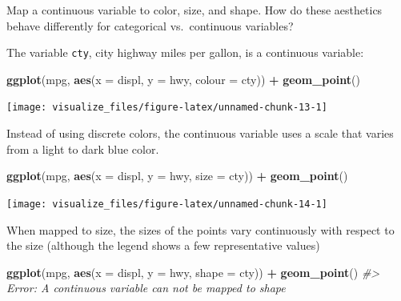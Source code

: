 \documentclass[]{book}
\newenvironment{Shaded}{\begin{snugshade}}{\end{snugshade}}
\newcommand{\CommentTok}[1]{\textcolor[rgb]{0.56,0.35,0.01}{\textit{#1}}}
\newcommand{\DataTypeTok}[1]{\textcolor[rgb]{0.13,0.29,0.53}{#1}}
\newcommand{\KeywordTok}[1]{\textcolor[rgb]{0.13,0.29,0.53}{\textbf{#1}}}
\newcommand{\NormalTok}[1]{#1}
\newcommand{\OperatorTok}[1]{\textcolor[rgb]{0.81,0.36,0.00}{\textbf{#1}}}
\newcommand{\StringTok}[1]{\textcolor[rgb]{0.31,0.60,0.02}{#1}}
\theoremstyle{plain}
\theoremstyle{remark}
\begin{document}
Map a continuous variable to color, size, and shape.
How do these aesthetics behave differently for categorical vs.~continuous variables?

The variable \texttt{cty}, city highway miles per gallon, is a continuous variable:

\begin{Shaded}
\begin{Highlighting}[]
\KeywordTok{ggplot}\NormalTok{(mpg, }\KeywordTok{aes}\NormalTok{(}\DataTypeTok{x =}\NormalTok{ displ, }\DataTypeTok{y =}\NormalTok{ hwy, }\DataTypeTok{colour =}\NormalTok{ cty)) }\OperatorTok{+}
\StringTok{  }\KeywordTok{geom_point}\NormalTok{()}
\end{Highlighting}
\end{Shaded}

\begin{center}\texttt{[image: visualize\_files/figure-latex/unnamed-chunk-13-1]} \end{center}

Instead of using discrete colors, the continuous variable uses a scale that varies from a light to dark blue color.

\begin{Shaded}
\begin{Highlighting}[]
\KeywordTok{ggplot}\NormalTok{(mpg, }\KeywordTok{aes}\NormalTok{(}\DataTypeTok{x =}\NormalTok{ displ, }\DataTypeTok{y =}\NormalTok{ hwy, }\DataTypeTok{size =}\NormalTok{ cty)) }\OperatorTok{+}
\StringTok{  }\KeywordTok{geom_point}\NormalTok{()}
\end{Highlighting}
\end{Shaded}

\begin{center}\texttt{[image: visualize\_files/figure-latex/unnamed-chunk-14-1]} \end{center}

When mapped to size, the sizes of the points vary continuously with respect to the size (although the legend shows a few representative values)

\begin{Shaded}
\begin{Highlighting}[]
\KeywordTok{ggplot}\NormalTok{(mpg, }\KeywordTok{aes}\NormalTok{(}\DataTypeTok{x =}\NormalTok{ displ, }\DataTypeTok{y =}\NormalTok{ hwy, }\DataTypeTok{shape =}\NormalTok{ cty)) }\OperatorTok{+}
\StringTok{  }\KeywordTok{geom_point}\NormalTok{()}
\CommentTok{#> Error: A continuous variable can not be mapped to shape}
\end{Highlighting}
\end{Shaded}
\end{document}
